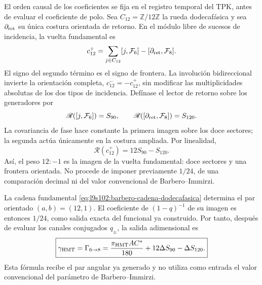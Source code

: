 El orden causal de los coeficientes se fija en el registro temporal del TPK,
antes de evaluar el coeficiente de polo. Sea \(C_{12}=\mathbb Z/12\mathbb Z\) la rueda
dodecafásica y sea \(\partial_{\rm ret}\) su única costura orientada de retorno.
En el módulo libre de sucesos de incidencia, la vuelta fundamental es
\begin{equation}
 c_{12}^{+}
 =\sum_{j\in C_{12}}[j,\mathcal F_6]
  -[\partial_{\rm ret},\mathcal F_8].
 \label{eq:l9s102:barbero-cadena-dodecafasica}
\end{equation}
El signo del segundo término es el signo de frontera. La involución
bidireccional invierte la orientación completa,
\(c_{12}^{-}=-c_{12}^{+}\), sin modificar las multiplicidades absolutas de
los dos tipos de incidencia. Defínase el lector de retorno sobre los
generadores por
\begin{equation}
 \mathscr R([j,\mathcal F_6])=S_{90},
 \qquad
 \mathscr R([\partial_{\rm ret},\mathcal F_8])=S_{120}.
 \label{eq:l9s102:barbero-lector-retorno}
\end{equation}
La covariancia de fase hace constante la primera imagen sobre los doce
sectores; la segunda actúa únicamente en la costura ampliada. Por linealidad,
\begin{equation}
 \boxed{\mathscr R(c_{12}^{+})=12S_{90}-S_{120}.}
 \label{eq:l9s102:barbero-peso-generado}
\end{equation}
Así, el peso \(12:-1\) es la imagen de la vuelta fundamental: doce sectores y
una frontera orientada. No procede de imponer previamente \(1/24\), de una
comparación decimal ni del valor convencional de Barbero--Immirzi.

\begin{theorem}
\label{thm:l9s102:barbero-funcional}
La cadena fundamental \eqref{eq:l9s102:barbero-cadena-dodecafasica} determina
el par orientado \((a,b)=(12,1)\). El coeficiente de \((1-q)^{-1}\) de su imagen es
entonces \(1/24\), como salida exacta del funcional ya construido. Por tanto,
después de evaluar los canales conjugados \(q_\pm\), la salida adimensional es
\begin{equation}
 \boxed{
 \gamma_{\rm HMT}=\Gamma_{6\to8}
 =\frac{\pi_{\rm HMT}AC^*}{180}
   +12\Delta S_{90}-\Delta S_{120}.}
 \label{eq:l9s102:barbero-gamma}
\end{equation}
Esta fórmula recibe el par angular ya generado y no utiliza como entrada
el valor convencional del parámetro de Barbero--Immirzi.
\end{theorem}

